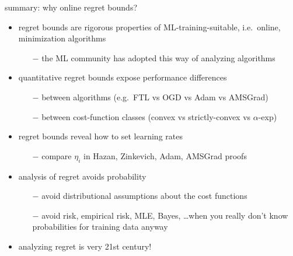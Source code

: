 \documentclass[svgnames,
               hyperref={colorlinks,citecolor=DeepPink4,linkcolor=FireBrick,urlcolor=Maroon},
               usepdftitle=false]  %
               {beamer}
\begin{document}
\begin{frame}{\alert{summary}: why online regret bounds?}

\begin{itemize}
\item regret bounds are rigorous properties of ML-training-suitable, i.e.~online, minimization algorithms
    \begin{itemize}
    \item[$-$] the ML community has adopted this way of analyzing algorithms
    \end{itemize}
\item quantitative regret bounds expose performance differences
    \begin{itemize}
    \item[$-$] between algorithms (e.g.~FTL vs OGD vs Adam vs AMSGrad)
    \item[$-$] between cost-function classes (convex vs strictly-convex vs $\alpha$-exp)
    \end{itemize}
\item regret bounds reveal how to set learning rates
    \begin{itemize}
    \item[$-$] compare $\eta_i$ in Hazan, Zinkevich, Adam, AMSGrad proofs    \end{itemize}
\item analysis of regret avoids probability
    \begin{itemize}
    \item[$-$] avoid distributional assumptions about the cost functions
    \item[$-$] avoid risk, empirical risk, MLE, Bayes, \dots when you really don't know probabilities for training data anyway
    \end{itemize}
\item analyzing regret is very 21st century!
\end{itemize}
\end{frame}
\end{document}
